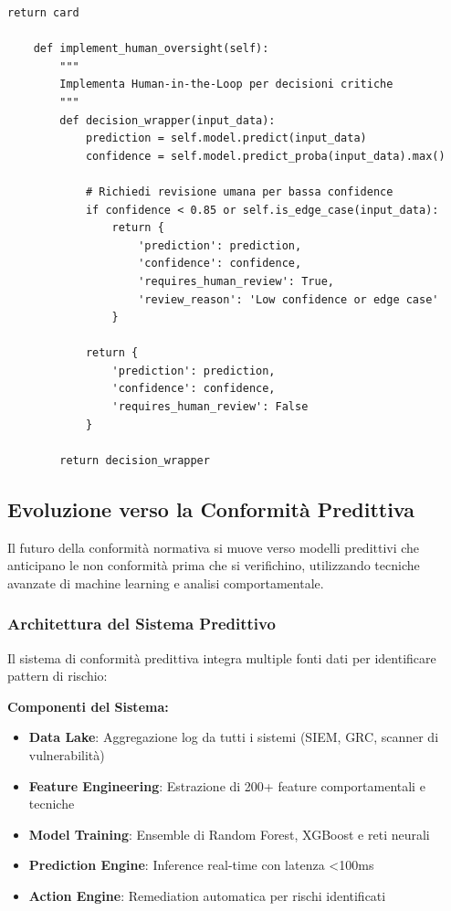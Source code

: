 \begin{lstlisting}[caption={Framework Python per AI Act Compliance},label={lst:ai_compliance}]
        return card
    
    def implement_human_oversight(self):
        """
        Implementa Human-in-the-Loop per decisioni critiche
        """
        def decision_wrapper(input_data):
            prediction = self.model.predict(input_data)
            confidence = self.model.predict_proba(input_data).max()
            
            # Richiedi revisione umana per bassa confidence
            if confidence < 0.85 or self.is_edge_case(input_data):
                return {
                    'prediction': prediction,
                    'confidence': confidence,
                    'requires_human_review': True,
                    'review_reason': 'Low confidence or edge case'
                }
            
            return {
                'prediction': prediction,
                'confidence': confidence,
                'requires_human_review': False
            }
        
        return decision_wrapper
\end{lstlisting}

\subsection{Evoluzione verso la Conformità Predittiva}

Il futuro della conformità normativa si muove verso modelli predittivi che anticipano le non conformità prima che si verifichino, utilizzando tecniche avanzate di machine learning e analisi comportamentale.

\subsubsection{Architettura del Sistema Predittivo}

Il sistema di conformità predittiva integra multiple fonti dati per identificare pattern di rischio:

\textbf{Componenti del Sistema:}
\begin{itemize}
    \item \textbf{Data Lake}: Aggregazione log da tutti i sistemi (SIEM, GRC, scanner di vulnerabilità)
    \item \textbf{Feature Engineering}: Estrazione di 200+ feature comportamentali e tecniche
    \item \textbf{Model Training}: Ensemble di Random Forest, XGBoost e reti neurali
    \item \textbf{Prediction Engine}: Inference real-time con latenza <100ms
    \item \textbf{Action Engine}: Remediation automatica per rischi identificati
\end{itemize}

